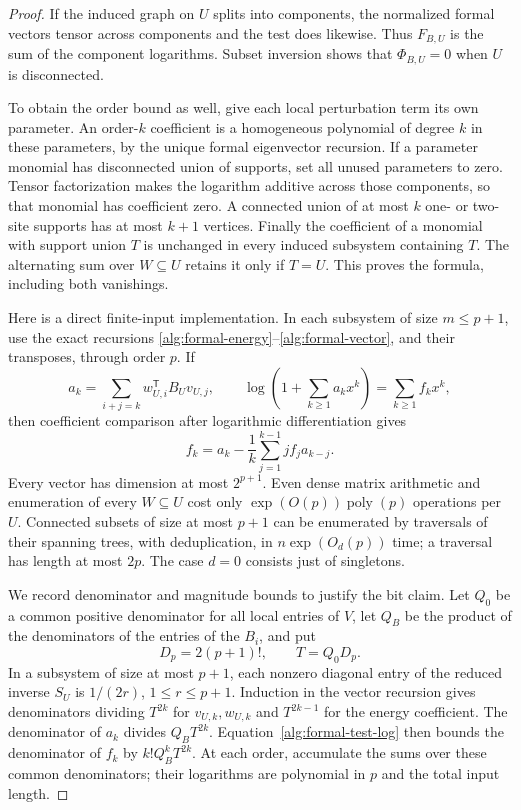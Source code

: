 \documentclass[reqno]{amsart}
\theoremstyle{definition}
\theoremstyle{remark}
\begin{document}
\begin{proof}
If the induced graph on \(U\) splits into components, the
normalized formal vectors tensor across components and the
test does likewise.  Thus \(F_{B,U}\) is the sum of the
component logarithms.  Subset inversion shows that
\(\Phi_{B,U}=0\) when \(U\) is disconnected.

To obtain the order bound as well, give each local perturbation
term its own parameter.  An order-\(k\) coefficient is a
homogeneous polynomial of degree \(k\) in these parameters,
by the unique formal eigenvector recursion.  If a parameter
monomial has disconnected union of supports, set all unused
parameters to zero.  Tensor factorization makes the logarithm
additive across those components, so that monomial has
coefficient zero.  A connected union of at most \(k\) one- or
two-site supports has at most \(k+1\) vertices.
Finally the coefficient of a monomial with support union \(T\)
is unchanged in every induced subsystem containing \(T\).
The alternating sum over \(W\subseteq U\) retains it only if
\(T=U\).  This proves the formula, including both vanishings.

Here is a direct finite-input implementation.  In each subsystem
of size \(m\le p+1\), use the exact recursions
\eqref{alg:formal-energy}--\eqref{alg:formal-vector}, and their
transposes, through order \(p\).
If
\[
 a_k=\sum_{i+j=k}w_{U,i}^{\mathsf T}B_Uv_{U,j},
 \qquad \log\left(1+\sum_{k\ge1}a_kx^k\right)
                  =\sum_{k\ge1}f_kx^k,
\]
then coefficient comparison after logarithmic differentiation gives
\begin{equation}\label{alg:formal-test-log}
 f_k=a_k-\frac1k\sum_{j=1}^{k-1}j f_j a_{k-j}.
\end{equation}
Every vector has dimension at most \(2^{p+1}\).
Even dense matrix arithmetic and enumeration of every
\(W\subseteq U\) cost only \(\exp(O(p))\operatorname{poly}(p)\)
operations per \(U\).  Connected subsets of size at most \(p+1\)
can be enumerated by traversals of their spanning trees, with
deduplication, in \(n\exp(O_d(p))\) time; a traversal has length
at most \(2p\).  The case \(d=0\) consists just of singletons.

We record denominator and magnitude bounds to justify the bit
claim.  Let \(Q_0\) be a common positive denominator for all local
entries of \(V\), let \(Q_B\) be the product of the denominators
of the entries of the \(B_i\), and put
\[
 D_p=2(p+1)!,\qquad T=Q_0D_p .
 \]
In a subsystem of size at most \(p+1\), each nonzero diagonal
entry of the reduced inverse \(S_U\) is \(1/(2r)\),
\(1\le r\le p+1\).  Induction in the vector recursion gives
denominators dividing \(T^{2k}\) for \(v_{U,k},w_{U,k}\)
and \(T^{2k-1}\) for the energy coefficient.
The denominator of \(a_k\) divides \(Q_BT^{2k}\).
Equation~\eqref{alg:formal-test-log} then bounds the denominator
of \(f_k\) by \(k!Q_B^kT^{2k}\).
At each order, accumulate the sums over these common
denominators; their logarithms are polynomial in
\(p\) and the total input length.


\end{proof}
\end{document}
